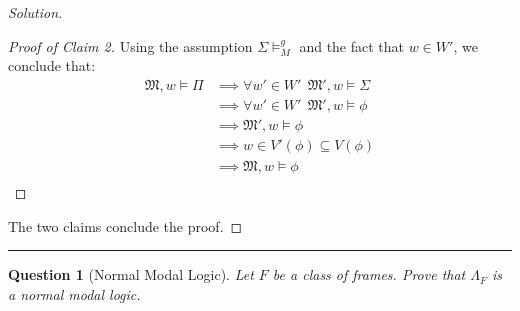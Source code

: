 \documentclass[12pt,a4paper]{report}
\newtheorem{question}{Question}
\theoremstyle{definition}
\newcommand{\model}[1]{\mathfrak{#1}}           %
\begin{document}
\begin{proof}[Solution]
\begin{proof}[Proof of Claim 2]
            Using the assumption $\Sigma \models_M^g$ and the fact that $w \in W'$, we conclude that:
            \[\begin{split}
                \model M, w \models \Pi &\implies \forall w' \in W' \,\; \model M', w \models \Sigma \\
                & \implies \forall w' \in W' \,\; \model M', w \models \phi \\
                & \implies \model M', w \models \phi \\
                & \implies w \in V'(\phi) \subseteq V(\phi)\\
                & \implies \model M, w \models \phi\\
            \end{split}\]
        \end{proof}

        The two claims conclude the proof.
    \end{proof}


    \quad

    \hrule

    \quad

    \newpage

    \begin{question}[Normal Modal Logic]
        Let $F$ be a class of frames. Prove that $\Lambda_{F}$ is a normal modal logic.
    \end{question}
\end{document}
